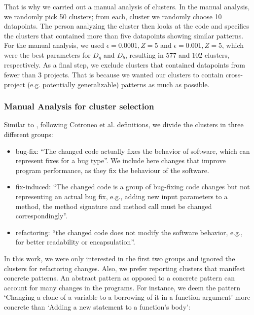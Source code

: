 That is why we carried out a manual analysis of clusters. In the manual analysis, we randomly pick 50 clusters; from each, cluster we randomly choose 10 datapoints. The person analyzing the cluster then looks at the code and specifies the clusters that contained more than five datapoints showing similar patterns. For the manual analysis, we used $\epsilon=0.0001, Z=5$ and $\epsilon=0.001, Z=5$, which were the best parameters for $D_g$ and $D_b$, resulting in 577 and 102 clusters, respectively. As a final step, we exclude clusters that contained datapoints from fewer than 3 projects. That is because we wanted our clusters to contain cross-project (e.g. potentially generalizable) patterns as much as possible.  

\subsubsection{\label{sec:manual_analysis_cluster_selection}Manual Analysis for cluster selection}

Similar to \cite{yang2022mining}, following Cotroneo et al. \cite{cotroneo2019analyzing} definitions, we divide the clusters in three different groups:

\begin{itemize}
    \item bug-fix: ``The changed code actually fixes the behavior of software, which can represent fixes for a bug type''. We include here changes that improve program performance, as they fix the behaviour of the software.
    
    \item fix-induced: ``The changed code is a group of bug-fixing code changes but not representing an actual bug fix, e.g., adding new input parameters to a method, the method signature and method call must be changed correspondingly''.
    
    \item refactoring: ``the changed code does not modify the software behavior, e.g., for better readability or encapsulation''.
\end{itemize}

In this work, we were only interested in the first two groups and ignored the clusters for refactoring changes. Also, we prefer reporting clusters that manifest concrete patterns. An abstract pattern as opposed to a concrete pattern can account for many changes in the programs. For instance, we deem the pattern `Changing a clone of a variable to a borrowing of it in a function argument' more concrete than `Adding a new statement to a function's body':

